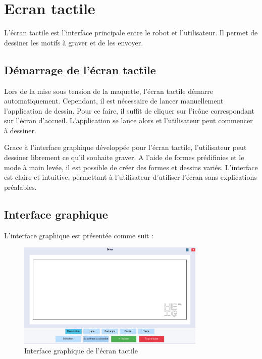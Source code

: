 \section{Ecran tactile}

L'écran tactile est l'interface principale entre le robot et l'utilisateur. Il permet de dessiner les motifs à graver et de les envoyer.

\subsection{Démarrage de l'écran tactile}

Lors de la mise sous tension de la maquette, l'écran tactile démarre automatiquement. Cependant, il est nécessaire de lancer manuellement l'application de dessin. Pour ce faire, il suffit de cliquer sur l'icône correspondant sur l'écran d'accueil. L'application se lance alors et l'utilisateur peut commencer à dessiner.

Grace à l'interface graphique développée pour l'écran tactile, l'utilisateur peut dessiner librement ce qu'il souhaite graver. A l'aide de formes prédifinies et le mode à main levée, il est possible de créer des formes et dessins variés. L'interface est claire et intuitive, permettant à l'utilisateur d'utiliser l'écran sans explications préalables.

\subsection{Interface graphique}

L'interface graphique est présentée comme suit :
\begin{figure}[H]
    \centering
    \includegraphics[width=0.8\textwidth]{assets/figures/Draw_app.png}
    \caption{Interface graphique de l'écran tactile}
    \label{fig:interface_graphique}
\end{figure}

